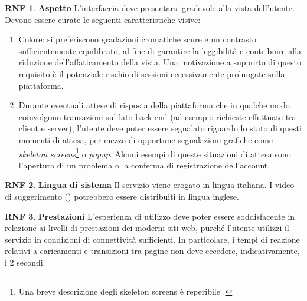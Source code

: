 \documentclass[11pt, a4paper]{article}
\theoremstyle{definition}
\newtheorem{nonfuncreq}{RNF} %
\begin{document}
\begin{nonfuncreq}
\textbf{Aspetto } L'interfaccia deve presentarsi gradevole alla vista dell'utente.
Devono essere curate le seguenti caratteristiche visive:
\begin{enumerate}
    \item Colore: si preferiscono gradazioni cromatiche scure e un contrasto
    sufficientemente equilibrato, al fine di garantire la leggibilità e
    contribuire alla riduzione dell'affaticamento della vista. Una motivazione
    a supporto di questo requisito è il potenziale rischio di sessioni eccessivamente
    prolungate sulla piattaforma.

    \item Durante eventuali attese di risposta della piattaforma che
    in qualche modo coinvolgono transazioni sul lato back-end (ad esempio
    richieste effettuate tra client e server), l'utente deve poter
    essere segnalato riguardo lo stato di questi momenti di attesa,
    per mezzo di opportune segnalazioni grafiche come \textit{skeleton
    screens}\footnote{Una breve descrizione degli skeleton screens è
    reperibile \href{https://www.nngroup.com/articles/skeleton-screens/}{\textcolor{blue}{}}.}
    o \textit{popup}. Alcuni esempi di queste situazioni di attesa sono
    l'apertura di un problema o la conferma di registrazione dell'account.
\end{enumerate}
\end{nonfuncreq}

\begin{nonfuncreq}
\textbf{Lingua di sistema }
Il servizio viene erogato in lingua italiana. I video di suggerimento
(\textcolor{blue}{})
potrebbero essere distribuiti in lingua inglese.
\end{nonfuncreq}

\begin{nonfuncreq}
\textbf{Prestazioni }
L'esperienza di utilizzo deve poter essere soddisfacente in relazione
ai livelli di prestazioni dei moderni siti web, purché l'utente utilizzi
il servizio in condizioni di connettività sufficienti. In particolare,
i tempi di reazione relativi a caricamenti e transizioni tra pagine non
deve eccedere, indicativamente, i 2 secondi.
\end{nonfuncreq}
\end{document}
